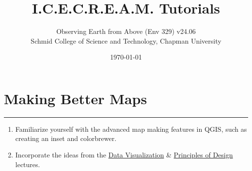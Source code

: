 \documentclass[oneside,a4paper,11pt,explicit]{book}
\title{I.C.E.C.R.E.A.M. Tutorials}
\subtitle{\small Observing Earth from Above (Env 329) v24.06 \\
	\small Schmid College of Science and Technology, Chapman University}
\date{\today}
\begin{document}
\dominitoc

\faketableofcontents

\setcounter{chapter}{11} %

\chapter{Making Better Maps} %

\vspace{-2em}

\minitoc

\hrule

\vspace{1em}

\begin{tcolorbox}[enhanced,frame style image=blueshade.png,
	opacityback=0.75,opacitybacktitle=0.25,
	colback=blue!5!white,colframe=blue!75!black,title={\Large \textbf{Objectives:}}]
	\large
	\begin{enumerate}
		\item Familiarize yourself with the advanced map making features in QGIS, such as creating an inset and colorbrewer.
		\item Incorporate the ideas from the \href{https://www.observingearthfromabove.com/uploads/b/150001442-463159049665547396/davidoff_unedited_130.mp4}{Data Visualization} \& \href{https://www.observingearthfromabove.com/uploads/b/150001442-463159049665547396/jan_export_final_101.mp4}{Principles of Design} lectures.
	\end{enumerate}
\end{tcolorbox}

\clearpage
\end{document}
